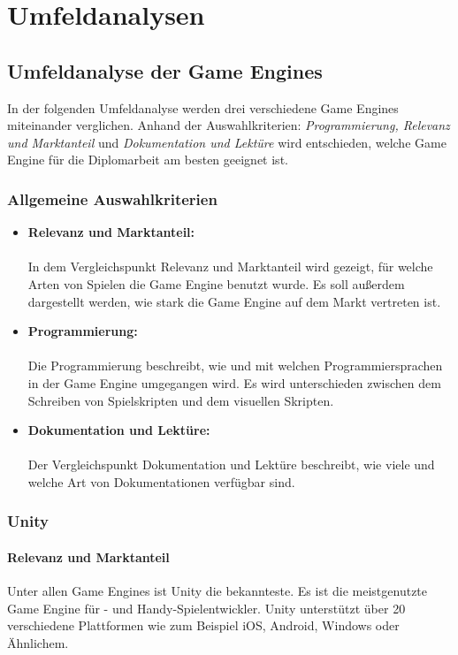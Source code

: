 \chapter{Umfeldanalysen}
\section{Umfeldanalyse der Game Engines}
In der folgenden Umfeldanalyse werden drei verschiedene Game Engines miteinander verglichen. Anhand der Auswahlkriterien: \textit{Programmierung, Relevanz und Marktanteil} und \textit{Dokumentation und Lektüre} wird entschieden, welche Game Engine für die Diplomarbeit am besten geeignet ist.

\subsection{Allgemeine Auswahlkriterien}
\begin{itemize}
  \item \textbf{Relevanz und Marktanteil:}\\\\ In dem Vergleichspunkt Relevanz und Marktanteil wird gezeigt, für welche Arten von Spielen die Game Engine benutzt wurde. Es soll außerdem dargestellt werden, wie stark die Game Engine auf dem Markt vertreten ist.
  \item \textbf{Programmierung:}\\\\ Die Programmierung beschreibt, wie und mit welchen Programmiersprachen in der Game Engine umgegangen wird. Es wird unterschieden zwischen dem Schreiben von Spielskripten und dem visuellen Skripten.
  \item \textbf{Dokumentation und Lektüre:}\\\\ Der Vergleichspunkt Dokumentation und Lektüre beschreibt, wie viele und welche Art von Dokumentationen verfügbar sind. 
\end{itemize}

\pagebreak

\subsection{Unity}
\subsubsection{Relevanz und Marktanteil}
Unter allen Game Engines ist Unity die bekannteste. Es ist die meistgenutzte Game Engine für - und Handy-Spielentwickler. Unity unterstützt über 20 verschiedene Plattformen wie zum Beispiel iOS, Android, Windows oder Ähnlichem.

